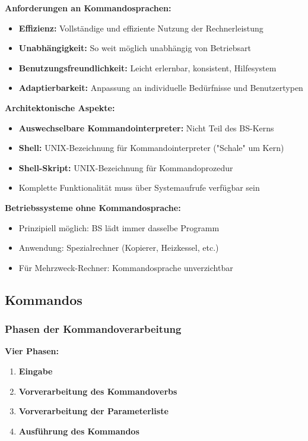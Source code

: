\documentclass[9pt,a4paper]{extarticle}
\begin{document}
\begin{multicols*}{2}
\textbf{Anforderungen an Kommandosprachen:}
\begin{itemize}
\item \textbf{Effizienz:} Vollständige und effiziente Nutzung der Rechnerleistung
\item \textbf{Unabhängigkeit:} So weit möglich unabhängig von Betriebsart
\item \textbf{Benutzungsfreundlichkeit:} Leicht erlernbar, konsistent, Hilfesystem
\item \textbf{Adaptierbarkeit:} Anpassung an individuelle Bedürfnisse und Benutzertypen
\end{itemize}

\textbf{Architektonische Aspekte:}
\begin{itemize}
\item \textbf{Auswechselbare Kommandointerpreter:} Nicht Teil des BS-Kerns
\item \textbf{Shell:} UNIX-Bezeichnung für Kommandointerpreter ("Schale" um Kern)
\item \textbf{Shell-Skript:} UNIX-Bezeichnung für Kommandoprozedur
\item Komplette Funktionalität muss über Systemaufrufe verfügbar sein
\end{itemize}

\textbf{Betriebssysteme ohne Kommandosprache:}
\begin{itemize}
\item Prinzipiell möglich: BS lädt immer dasselbe Programm
\item Anwendung: Spezialrechner (Kopierer, Heizkessel, etc.)
\item Für Mehrzweck-Rechner: Kommandosprache unverzichtbar
\end{itemize}

\subsection{Kommandos}
\subsubsection{Phasen der Kommandoverarbeitung}
\textbf{Vier Phasen:}
\begin{enumerate}
\item \textbf{Eingabe}
\item \textbf{Vorverarbeitung des Kommandoverbs}
\item \textbf{Vorverarbeitung der Parameterliste}
\item \textbf{Ausführung des Kommandos}
\end{enumerate}


\end{multicols*}
\end{document}
